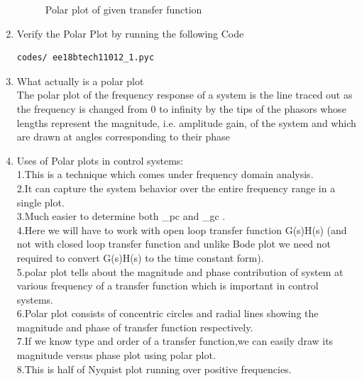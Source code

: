 \begin{enumerate}[label=\thesection.\arabic*.,ref=\thesection.\theenumi]
\begin{figure}
    \caption{Polar plot of given transfer function}
    \label{fig:Graph}
\end{figure}
\item
Verify the Polar Plot by running the following Code\\
\begin{lstlisting}
codes/ ee18btech11012_1.pyc
\end{lstlisting}
\item
What actually is a polar plot\\
The polar plot of the frequency response of a system is the line traced out as the frequency is changed from 0 to infinity by the tips of the phasors whose lengths represent the magnitude, i.e. amplitude gain, of the system and which are drawn at angles corresponding to their phase 
\item
Uses of Polar plots in control systems:\\
1.This is a technique which comes under frequency domain analysis.\\
2.It can capture the system behavior over the entire frequency range in a single plot.\\
3.Much easier to determine both \omega_{pc} and \omega_{gc} .\\


4.Here we will have to work with open loop transfer function G(s)H(s) (and not with closed loop transfer function and unlike Bode plot we need not required to convert G(s)H(s) to the time constant form).\\
5.polar plot tells about the magnitude and phase contribution of system at various frequency of a transfer function which is important in control systems.\\
6.Polar plot consists of concentric circles and radial lines showing the magnitude and phase of transfer function respectively.\\
7.If we know type and order of a transfer function,we can easily draw its magnitude versus phase plot using polar plot.\\
8.This is half of Nyquist plot running over positive frequencies.


\end{enumerate}
